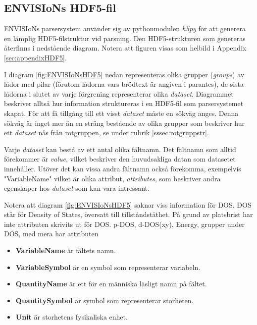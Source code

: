 \newpage
\subsection{ENVISIoNs HDF5-fil}
ENVISIoNs parsersystem använder sig av pythonmodulen \textit{h5py} för att generera en lämplig HDF5-filstruktur vid parsning. Den HDF5-strukturen som genereras återfinns i nedstående diagram. Notera att figuren visas som helbild i Appendix \ref{sec:appendixHDF5}.


I diagram \ref{fig:ENVISIoNsHDF5} nedan representeras olika grupper (\textit{groups}) av lådor med pilar (förutom lådorna vars brödtext är angiven i parantes), de sista lådorna i slutet av varje förgrening representerar olika \textit{dataset}. Diagrammet beskriver alltså hur information struktureras i en HDF5-fil som parsersystemet skapat. För att få tillgång till ett visst \textit{dataset} måste en sökväg anges. Denna sökväg är inget mer än en sträng bestående av olika grupper som beskriver hur ett \textit{dataset} nås från rotgruppen, se under rubrik \ref{sssec:rotgruppstr}. 

Varje \textit{dataset} kan bestå av ett antal olika fältnamn. Det fältnamn som alltid förekommer är \textit{value}, vilket beskriver den huvudsakliga datan som datasetet innehåller. Utöver det kan vissa andra fältnamn också förekomma, exempelvis "VariableName" vilket är olika attribut, \textit{attributes}, som beskriver andra egenskaper hos \textit{dataset} som kan vara intressant. 

Notera att diagram \ref{fig:ENVISIoNsHDF5} saknar viss information för DOS. DOS står för Density of States, översatt till tillståndstäthet. På grund av platsbrist har inte attributen skrivits ut för DOS. p-DOS, d-DOS(xy), Energy, grupper under DOS, med mera har attributen  

\begin{itemize}
 \item {\textbf{VariableName}} är fältets namn.
 \item{\textbf{VariableSymbol}} är en symbol som representerar variabeln. 
 \item{\textbf{QuantityName}} är ett för en människa läsligt namn på fältet. 
 \item{\textbf{QuantitySymbol}} är symbol som representerar storheten.
 \item{\textbf{Unit}} är storhetens fysikaliska enhet.
\end{itemize}

